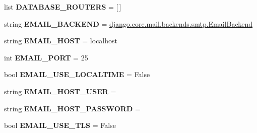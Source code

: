 \begin{DoxyCompactItemize}
\mbox{\label{namespacedjango_1_1conf_1_1global__settings_ae417dae9a5b7339fd50b427db24e5cb0}} 
list {\bfseries D\+A\+T\+A\+B\+A\+S\+E\+\_\+\+R\+O\+U\+T\+E\+RS} = \mbox{[}$\,$\mbox{]}
\item 
\mbox{\label{namespacedjango_1_1conf_1_1global__settings_a8b58b85a5917e6c5849f31a0bcf5f4c9}} 
string {\bfseries E\+M\+A\+I\+L\+\_\+\+B\+A\+C\+K\+E\+ND} = \textquotesingle{}\mbox{\hyperlink{classdjango_1_1core_1_1mail_1_1backends_1_1smtp_1_1_email_backend}{django.\+core.\+mail.\+backends.\+smtp.\+Email\+Backend}}\textquotesingle{}
\item 
\mbox{\label{namespacedjango_1_1conf_1_1global__settings_ae56abe407e55b5a63adc5f68d80eb14e}} 
string {\bfseries E\+M\+A\+I\+L\+\_\+\+H\+O\+ST} = \textquotesingle{}localhost\textquotesingle{}
\item 
\mbox{\label{namespacedjango_1_1conf_1_1global__settings_a77c10bcb1a272e0c384d59d9456f0ad1}} 
int {\bfseries E\+M\+A\+I\+L\+\_\+\+P\+O\+RT} = 25
\item 
\mbox{\label{namespacedjango_1_1conf_1_1global__settings_acbb741714a0548de8ca7ff5444fa3a6b}} 
bool {\bfseries E\+M\+A\+I\+L\+\_\+\+U\+S\+E\+\_\+\+L\+O\+C\+A\+L\+T\+I\+ME} = False
\item 
\mbox{\label{namespacedjango_1_1conf_1_1global__settings_ad644b14fdc3f7f2055269e077d00819c}} 
string {\bfseries E\+M\+A\+I\+L\+\_\+\+H\+O\+S\+T\+\_\+\+U\+S\+ER} = \textquotesingle{}\textquotesingle{}
\item 
\mbox{\label{namespacedjango_1_1conf_1_1global__settings_a7c067d049c227b4b9c58d1944426af53}} 
string {\bfseries E\+M\+A\+I\+L\+\_\+\+H\+O\+S\+T\+\_\+\+P\+A\+S\+S\+W\+O\+RD} = \textquotesingle{}\textquotesingle{}
\item 
\mbox{\label{namespacedjango_1_1conf_1_1global__settings_a81adee02cf7b9511f04677df7c5e31f5}} 
bool {\bfseries E\+M\+A\+I\+L\+\_\+\+U\+S\+E\+\_\+\+T\+LS} = False

\end{DoxyCompactItemize}
